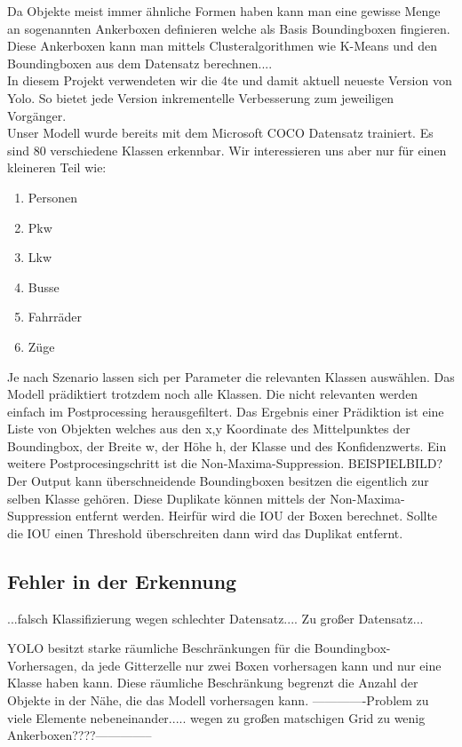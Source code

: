 \documentclass[conference]{IEEEtran}
\begin{document}
	Da Objekte meist immer ähnliche Formen haben kann man eine gewisse Menge an sogenannten Ankerboxen definieren welche als Basis Boundingboxen fingieren. Diese Ankerboxen kann man mittels Clusteralgorithmen wie K-Means und den Boundingboxen aus dem Datensatz berechnen....\\
	In diesem Projekt verwendeten wir die 4te und damit aktuell neueste Version von Yolo\cite{b2}. So bietet jede Version inkrementelle Verbesserung zum jeweiligen Vorgänger.\\
	Unser Modell wurde bereits mit dem Microsoft COCO Datensatz trainiert. Es sind 80 verschiedene Klassen erkennbar. Wir interessieren uns aber nur für einen kleineren Teil wie:
	\begin{enumerate}
		\item Personen
		\item Pkw
		\item Lkw
		\item Busse
		\item Fahrräder
		\item Züge
	\end{enumerate}
	Je nach Szenario lassen sich per Parameter die relevanten Klassen auswählen. Das Modell prädiktiert trotzdem noch alle Klassen. Die nicht relevanten werden einfach im Postprocessing herausgefiltert. Das Ergebnis einer Prädiktion ist eine Liste von Objekten welches aus den x,y Koordinate des Mittelpunktes der Boundingbox, der Breite w, der Höhe h, der Klasse und des Konfidenzwerts.
	Ein weitere Postprocesingschritt ist die Non-Maxima-Suppression. BEISPIELBILD? Der Output kann überschneidende Boundingboxen besitzen die eigentlich zur selben Klasse gehören. Diese Duplikate können mittels der Non-Maxima-Suppression entfernt werden. Heirfür wird die IOU der Boxen berechnet. Sollte die IOU einen Threshold überschreiten dann wird das Duplikat entfernt.
	
	\subsection{Fehler in der Erkennung}
	...falsch Klassifizierung wegen schlechter Datensatz....
	Zu großer Datensatz...
	
	YOLO besitzt starke räumliche Beschränkungen für die Boundingbox-Vorhersagen, da jede Gitterzelle nur zwei Boxen vorhersagen kann und nur eine Klasse haben kann. Diese räumliche Beschränkung begrenzt die Anzahl der Objekte in der Nähe, die das Modell vorhersagen kann. 
	-------------Problem zu viele Elemente nebeneinander..... wegen zu großen matschigen Grid zu wenig Ankerboxen????--------------
\end{document}
